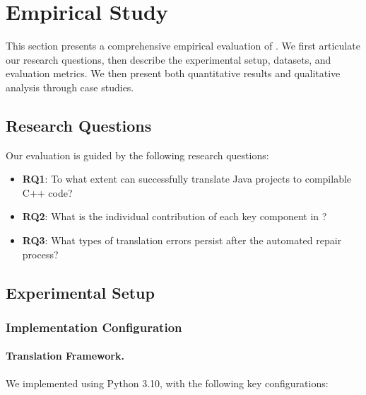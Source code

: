 
\section{Empirical Study}

This section presents a comprehensive empirical evaluation of \tool{}. We first articulate our research questions, then describe the experimental setup, datasets, and evaluation metrics. We then present both quantitative results and qualitative analysis through case studies.

\subsection{Research Questions}

Our evaluation is guided by the following research questions:

\begin{itemize}
\item \textbf{RQ1}: To what extent can \tool{} successfully translate Java projects to compilable C++ code? 

\item \textbf{RQ2}: What is the individual contribution of each key component in \tool{}? 

\item \textbf{RQ3}: What types of translation errors persist after the automated repair process? 
\end{itemize}

\subsection{Experimental Setup}

\subsubsection{Implementation Configuration}

\paragraph{Translation Framework.} We implemented \tool{} using Python 3.10, with the following key configurations:

